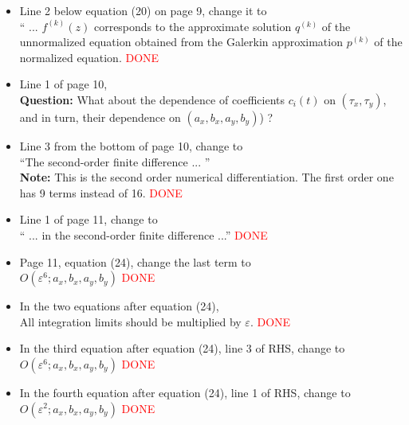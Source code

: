 \documentclass[12pt]{article}
\begin{document}
\begin{itemize}
\item Line 2 below equation (20) on page 9, change it to \\
  `` ... $f^{(k)}(z)$ corresponds to the approximate solution
  $q^{(k)}$ of the unnormalized equation obtained from the Galerkin
  approximation $p^{(k)}$ of the normalized equation.
  \textcolor{red}{DONE}

\item Line 1 of page 10,  \\
{\bf Question:} What about the dependence of coefficients $c_i(t)$ on 
$(\tau_x, \tau_y)$, and in turn, their dependence on $(a_x, b_x, a_y, b_y)$) ?

\item Line 3 from the bottom of page 10, change to \\
  ``The second-order finite difference ... '' \\
  {\bf Note:} This is the second order numerical differentiation. The
  first order one has 9 terms instead of 16.
    \textcolor{red}{DONE}

\item Line 1 of page 11, change to \\
  `` ... in the second-order finite difference ...''
    \textcolor{red}{DONE}

  \item Page 11, equation (24),  change the last term to \\
    $O(\varepsilon^6; a_x, b_x, a_y, b_y) $ \textcolor{red}{DONE}

  \item In the two equations after equation (24),  \\
    All integration limits should be multiplied by $\varepsilon$.
    \textcolor{red}{DONE}

\item In the third equation after equation (24),  line 3 of RHS, change to  \\
  $ O(\varepsilon^6; a_x, b_x, a_y, b_y) $ \textcolor{red}{DONE}

  \item In the fourth equation after equation (24),  line 1 of RHS, change to  \\
    $ O(\varepsilon^2; a_x, b_x, a_y, b_y) $ \textcolor{red}{DONE}

\end{itemize}
\end{document}
